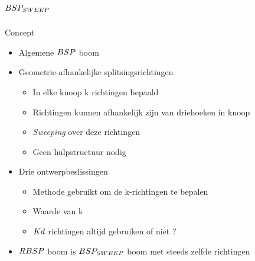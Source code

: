 \documentclass[11pt,t]{beamer}
\begin{document}
\section{$BSP_{SWEEP}$}

\begin{frame}{Concept}
	\begin{itemize}
		\item Algemene $BSP$ boom
		\item Geometrie-afhankelijke splitsingsrichtingen
		\begin{itemize}
			\item In elke knoop k richtingen bepaald
			\item Richtingen kunnen afhankelijk zijn van driehoeken in knoop
			\item \textit{Sweeping} over deze richtingen
			\item Geen hulpstructuur nodig
		\end{itemize}
		\item Drie ontwerpbeslissingen
		\begin{itemize}
			\item Methode gebruikt om de k-richtingen te bepalen
			\item Waarde van k
			\item $Kd$ richtingen altijd gebruiken of niet ?
		\end{itemize}
		\item $RBSP$ boom is $BSP_{SWEEP}$ boom met steeds zelfde richtingen
	\end{itemize}

\end{frame}
\end{document}
